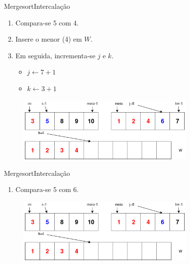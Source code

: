 \documentclass[aspectratio=169]{beamer}
\begin{document}
\begin{frame}{Mergesort}{Intercalação}
\begin{enumerate}
 \item Compara-se 5 com 4.
 \item Insere o menor (4) em $W$.
 \item Em seguida, incrementa-se $j$ e $k$.
 \begin{itemize}
 \item $j\leftarrow 7 + 1$
 \item $k\leftarrow 3 + 1$
 \end{itemize}  
\end{enumerate}

\begin{figure}[!h]
  \centering
  \includegraphics[width=250pt]{imgs/merge/merge5.png}
  \label{fig_merge4_2}
\end{figure}
\end{frame}

\begin{frame}{Mergesort}{Intercalação}
\begin{enumerate}
 \item Compara-se 5 com 6.
\end{enumerate}

\begin{figure}[!h]
  \centering
  \includegraphics[width=250pt]{imgs/merge/merge5.png}
  \label{fig_merge5}
\end{figure}
\end{frame}

\end{document}
